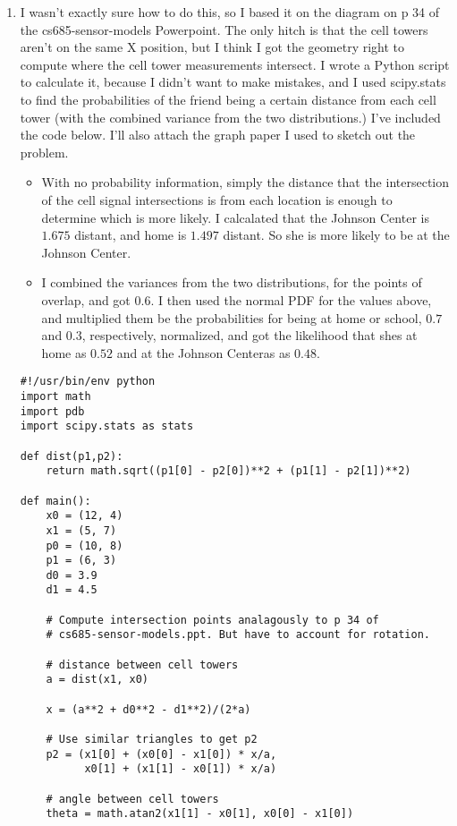 \documentclass[letter,8pt]{article}
\begin{document}
\begin{enumerate}
\item I wasn't exactly sure how to do this, so I based it on the
  diagram on p 34 of the cs685-sensor-models Powerpoint. The only
  hitch is that the cell towers aren't on the same X position, but I
  think I got the geometry right to compute where the cell tower measurements
  intersect. I wrote a Python script to calculate it, because I didn't
  want to make mistakes, and I used scipy.stats to find the probabilities
  of the friend being a certain distance from each cell tower (with the
  combined variance from the two distributions.) I've included the code
  below. I'll also attach the graph paper I used to sketch out the
  problem.
  \begin{itemize}
  \item With no probability information, simply the distance that the
    intersection of the cell signal intersections is from each location is enough
    to determine which is more likely. I calcalated that the Johnson
    Center is $1.675$ distant, and home is $1.497$ distant. So she
    is more likely to be at the Johnson Center.
  \item I combined the variances from the two distributions, for the points of overlap,
    and got $0.6$. I then used the normal PDF for the values above, and multiplied them
    be the probabilities for being at home or school, $0.7$ and $0.3$, respectively, normalized,
    and got the likelihood that shes at home as $0.52$ and at the Johnson Centeras as $0.48$.
  \end{itemize}
  \begin{verbatim}
#!/usr/bin/env python
import math
import pdb
import scipy.stats as stats

def dist(p1,p2):
    return math.sqrt((p1[0] - p2[0])**2 + (p1[1] - p2[1])**2)

def main():
    x0 = (12, 4)
    x1 = (5, 7)
    p0 = (10, 8)
    p1 = (6, 3)
    d0 = 3.9
    d1 = 4.5
    
    # Compute intersection points analagously to p 34 of
    # cs685-sensor-models.ppt. But have to account for rotation.
    
    # distance between cell towers
    a = dist(x1, x0)
    
    x = (a**2 + d0**2 - d1**2)/(2*a)

    # Use similar triangles to get p2
    p2 = (x1[0] + (x0[0] - x1[0]) * x/a,
          x0[1] + (x1[1] - x0[1]) * x/a)

    # angle between cell towers
    theta = math.atan2(x1[1] - x0[1], x0[0] - x1[0])


\end{verbatim}
\end{enumerate}
\end{document}
